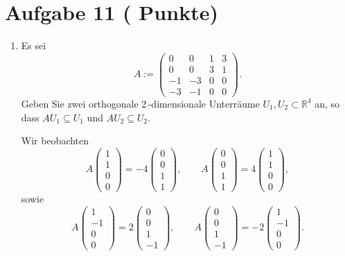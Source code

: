 \documentclass[11pt, a4paper]{article}
\newcommand{\aufgabe}[2]{%
  \section*{\Large\bfseries Aufgabe #1%
  \if\relax\detokenize{#2}\relax\else \hfill\normalfont\normalsize(#2 Punkte)\fi}%
  \vspace{-1.5ex}
}
\begin{document}
\aufgabe{11}{}
\begin{enumerate}
  \item Es sei
  \[
    A:=
    \begin{pmatrix}
      0 & 0 & 1 & 3\\
      0 & 0 & 3 & 1\\
     -1 & -3 & 0 & 0\\
     -3 & -1 & 0 & 0
    \end{pmatrix}.
  \]
  Geben Sie zwei orthogonale 2\,-dimensionale Unterräume $U_1,U_2\subset \mathbb{R}^4$ an, so dass $AU_1\subseteq U_1$ und $AU_2\subseteq U_2$.
  \begin{framed}
  Wir beobachten
  \[
    A\!\begin{pmatrix}1\\1\\0\\0\end{pmatrix}=-4\!\begin{pmatrix}0\\0\\1\\1\end{pmatrix},
    \qquad
    A\!\begin{pmatrix}0\\0\\1\\1\end{pmatrix}=4\!\begin{pmatrix}1\\1\\0\\0\end{pmatrix},
  \]
  sowie
  \[
    A\!\begin{pmatrix}1\\-1\\0\\0\end{pmatrix}=2\!\begin{pmatrix}0\\0\\1\\-1\end{pmatrix},
    \qquad
    A\!\begin{pmatrix}0\\0\\1\\-1\end{pmatrix}=-2\!\begin{pmatrix}1\\-1\\0\\0\end{pmatrix}.
\]
\end{framed}
\end{enumerate}
\end{document}
